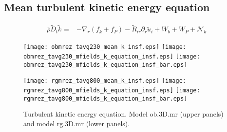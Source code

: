 \documentclass[10pt,paper=a4]{report}
\newcommand{\eht}{\overline}
\newcommand{\fht}{\widetilde}
\newcommand{\fav}{\widetilde}
\newcommand{\av}{\overline}
\begin{document}





\newpage

\subsection{Mean turbulent kinetic energy equation}

\begin{align}
\av{\rho} \fav{D}_t \fav{k}^{ } = & -\nabla_r ( f_k +  f_P ) - \fht{R}_{ir}\partial_r \fht{u}_i + W_b + W_P + {\mathcal N_k}  \label{eq:rans_tke}
\end{align}

\begin{figure}[!h]
\centerline{
\texttt{[image: obmrez\_tavg230\_mean\_k\_insf.eps]}
\texttt{[image: obmrez\_tavg230\_mfields\_k\_equation\_insf.eps]}
\texttt{[image: obmrez\_tavg230\_mfields\_k\_equation\_insf\_bar.eps]}}

\centerline{
\texttt{[image: rgmrez\_tavg800\_mean\_k\_insf.eps]}
\texttt{[image: rgmrez\_tavg800\_mfields\_k\_equation\_insf.eps]}
\texttt{[image: rgmrez\_tavg800\_mfields\_k\_equation\_insf\_bar.eps]}}
\caption{Turbulent kinetic energy equation. Model {\sf ob.3D.mr} (upper panels) and model {\sf rg.3D.mr} (lower panels). \label{fig:k-equation}}
\end{figure}
\end{document}
